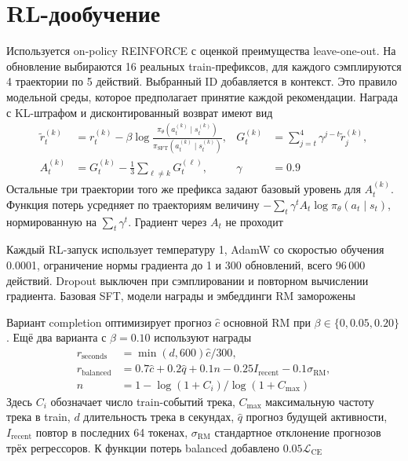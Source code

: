 \FloatBarrier
{}
\section{RL-дообучение}

Используется on-policy REINFORCE с оценкой преимущества leave-one-out.
На обновление выбираются 16 реальных train-префиксов,
для каждого сэмплируются 4 траектории по 5 действий.
Выбранный ID добавляется в контекст. Это правило модельной среды,
которое предполагает принятие каждой рекомендации.
Награда с KL-штрафом и дисконтированный возврат имеют вид
\begin{align*}
  \widetilde r_t^{(k)}&=r_t^{(k)}-\beta\log
    \frac{\pi_\theta(a_t^{(k)}\mid s_t^{(k)})}{\pi_{\mathrm{SFT}}(a_t^{(k)}\mid s_t^{(k)})},
  &G_t^{(k)}&=\sum_{j=t}^{4}\gamma^{j-t}\widetilde r_j^{(k)},\\
  A_t^{(k)}&=G_t^{(k)}-\frac{1}{3}\sum_{\ell\ne k}G_t^{(\ell)},
  &\gamma&=0.9
\end{align*}
Остальные три траектории того же префикса задают базовый уровень
для \(A_t^{(k)}\). Функция потерь усредняет по траекториям величину
\(-\sum_t\gamma^t A_t\log\pi_\theta(a_t\mid s_t)\),
нормированную на \(\sum_t\gamma^t\). Градиент через \(A_t\) не проходит

Каждый RL-запуск использует температуру 1, AdamW со скоростью обучения
0.0001, ограничение нормы градиента до 1 и 300 обновлений,
всего 96\,000 действий. Dropout выключен при сэмплировании
и повторном вычислении градиента. Базовая SFT, модели награды
и эмбеддинги RM заморожены

Вариант completion оптимизирует прогноз \(\widehat c\) основной RM
при \(\beta\in\lbrace0,0.05,0.20\rbrace\).
Ещё два варианта с \(\beta=0.10\) используют награды
\begin{align*}
  r_{\mathrm{seconds}}&=\min(d,600)\widehat c/300,\\
  r_{\mathrm{balanced}}&=0.7\widehat c+0.2\widehat q+0.1n-0.25I_{\mathrm{recent}}-0.1\sigma_{\mathrm{RM}},\\
  n&=1-\log(1+C_i)/\log(1+C_{\max})
\end{align*}
Здесь \(C_i\) обозначает число train-событий трека,
\(C_{\max}\) максимальную частоту трека в train,
\(d\) длительность трека в секундах,
\(\widehat q\) прогноз будущей активности,
\(I_{\mathrm{recent}}\) повтор в последних 64 токенах,
\(\sigma_{\mathrm{RM}}\) стандартное отклонение прогнозов трёх регрессоров.
К функции потерь balanced добавлено \(0.05\mathcal L_{\mathrm{CE}}\)

